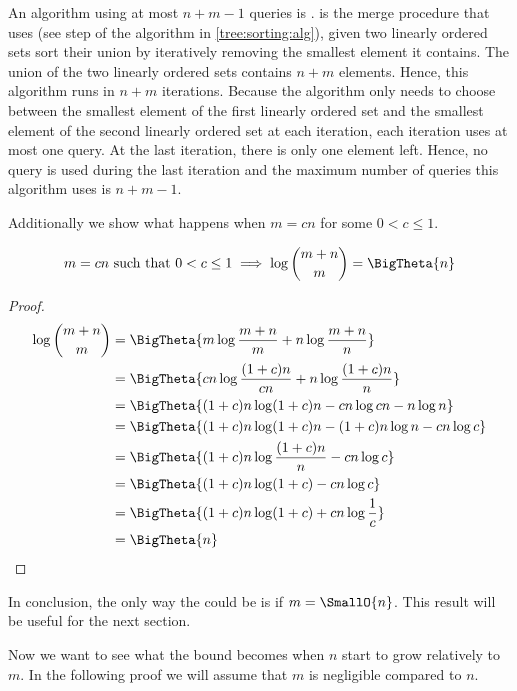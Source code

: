 An algorithm using at most \(n+m-1\) queries is \tapemerge. \tapemerge is the
merge procedure that \mergesort uses (see step  of the \mergesort
algorithm in \ref{tree:sorting:alg}), \ie given two linearly ordered sets sort
their union by iteratively removing the smallest element it contains. The union
of the two linearly ordered sets contains \(n+m\) elements. Hence, this
algorithm runs in \(n+m\) iterations. Because the algorithm only needs to
choose between the smallest element of the first linearly ordered set and the
smallest element of the second linearly ordered set at each iteration, each
iteration uses at most one query. At the last iteration, there is only one
element left. Hence, no query is used during the last iteration and the maximum
number of queries this algorithm uses is \(n+m-1\).

Additionally we show what happens when \(m = c n\) for some \(0 < c \le 1\).

\begin{lemma}
\begin{align*}
m = c n \text{ such that } 0 < c \le 1 &\implies \log\binom{m+n}{m} = \BigTheta{n}\\
\end{align*}
\end{lemma}

\begin{proof}
\begin{align*}
\log\binom{m+n}{m} &= \BigTheta{m \log\frac{m+n}{m} + n \log\frac{m+n}{n}}\\
&= \BigTheta{cn \log\frac{(1+c)n}{cn} + n \log\frac{(1+c)n}{n}}\\
&= \BigTheta{(1+c)n \log (1+c)n - cn \log cn - n \log n}\\
&= \BigTheta{(1+c)n \log (1+c)n - (1+c)n \log n - cn \log c}\\
&= \BigTheta{(1+c)n \log \frac{(1+c)n}{n} - cn \log c}\\
&= \BigTheta{(1+c)n \log (1+c) - cn \log c}\\
&= \BigTheta{(1+c)n \log (1+c) + cn \log \frac{1}{c}}\\
&= \BigTheta{n}\\
\end{align*}
\end{proof}

In conclusion, the only way the  could be  is if \(m =
\SmallO{n}\). This result will be useful for the next section.

Now we want to see what the bound becomes when $n$ start to grow relatively to
$m$. In the following proof we will assume that $m$ is negligible compared to $n$.


